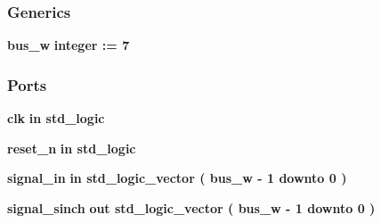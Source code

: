 \subsubsection*{Generics}
 \begin{DoxyCompactItemize}
\item 
{\bf bus\+\_\+w} {\bfseries {\bfseries \textcolor{comment}{integer}\textcolor{vhdlchar}{ }\textcolor{vhdlchar}{ }\textcolor{vhdlchar}{\+:}\textcolor{vhdlchar}{=}\textcolor{vhdlchar}{ }\textcolor{vhdlchar}{ } \textcolor{vhdldigit}{7} \textcolor{vhdlchar}{ }}}
\end{DoxyCompactItemize}
\subsubsection*{Ports}
 \begin{DoxyCompactItemize}
\item 
{\bf clk}  {\bfseries {\bfseries \textcolor{keywordflow}{in}\textcolor{vhdlchar}{ }}} {\bfseries \textcolor{comment}{std\+\_\+logic}\textcolor{vhdlchar}{ }} 
\item 
{\bf reset\+\_\+n}  {\bfseries {\bfseries \textcolor{keywordflow}{in}\textcolor{vhdlchar}{ }}} {\bfseries \textcolor{comment}{std\+\_\+logic}\textcolor{vhdlchar}{ }} 
\item 
{\bf signal\+\_\+in}  {\bfseries {\bfseries \textcolor{keywordflow}{in}\textcolor{vhdlchar}{ }}} {\bfseries \textcolor{comment}{std\+\_\+logic\+\_\+vector}\textcolor{vhdlchar}{ }\textcolor{vhdlchar}{(}\textcolor{vhdlchar}{ }\textcolor{vhdlchar}{ }\textcolor{vhdlchar}{ }\textcolor{vhdlchar}{ }{\bfseries {\bf bus\+\_\+w}} \textcolor{vhdlchar}{-\/}\textcolor{vhdlchar}{ } \textcolor{vhdldigit}{1} \textcolor{vhdlchar}{ }\textcolor{keywordflow}{downto}\textcolor{vhdlchar}{ }\textcolor{vhdlchar}{ } \textcolor{vhdldigit}{0} \textcolor{vhdlchar}{ }\textcolor{vhdlchar}{)}\textcolor{vhdlchar}{ }} 
\item 
{\bf signal\+\_\+sinch}  {\bfseries {\bfseries \textcolor{keywordflow}{out}\textcolor{vhdlchar}{ }}} {\bfseries \textcolor{comment}{std\+\_\+logic\+\_\+vector}\textcolor{vhdlchar}{ }\textcolor{vhdlchar}{(}\textcolor{vhdlchar}{ }\textcolor{vhdlchar}{ }\textcolor{vhdlchar}{ }\textcolor{vhdlchar}{ }{\bfseries {\bf bus\+\_\+w}} \textcolor{vhdlchar}{-\/}\textcolor{vhdlchar}{ } \textcolor{vhdldigit}{1} \textcolor{vhdlchar}{ }\textcolor{keywordflow}{downto}\textcolor{vhdlchar}{ }\textcolor{vhdlchar}{ } \textcolor{vhdldigit}{0} \textcolor{vhdlchar}{ }\textcolor{vhdlchar}{)}\textcolor{vhdlchar}{ }} 
\end{DoxyCompactItemize}


